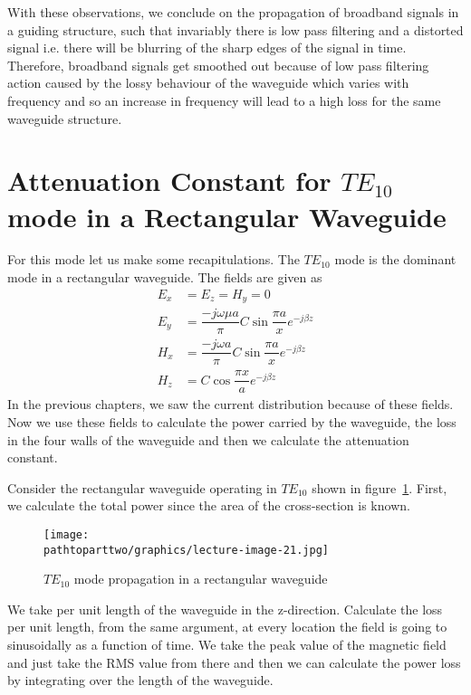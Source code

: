 With these observations, we conclude on the propagation of broadband signals in a guiding structure, such that invariably there is low pass filtering and a distorted signal i.e. there will be blurring of the sharp edges of the signal in time. Therefore, broadband signals get smoothed out because of low pass filtering action caused by the lossy behaviour of the waveguide which varies with frequency and so an increase in frequency will lead to a high loss for the same waveguide structure.

\section{Attenuation Constant for $TE_{10}$ mode in a Rectangular Waveguide}
For this mode let us make some recapitulations. The $TE_{10}$ mode is the dominant mode in a rectangular waveguide. The fields are given as
\begin{align}
E_{x} &= E_{z} = H_{y} = 0\\
E_{y} &= \dfrac{-j\omega\mu a }{\pi}C\sin \dfrac{\pi a}{x} e ^{-j\beta z}\label{eqn:eyrecte10}\\
H_{x} &= \dfrac{-j\omega a}{\pi} C \sin\dfrac{\pi a}{x}
e^{-j\beta z}\label{eqn:hxrecte10}\\
H_{z} &= C\cos \dfrac{\pi x}{a} e^{-j\beta z}\label{eqn:hzrecte10}
\end{align}
In the previous chapters, we saw the current distribution because of these fields. Now we use these fields to calculate the power carried by the waveguide, the loss in the four walls of the waveguide and then we calculate the attenuation constant.

Consider the rectangular waveguide operating in $TE_{10}$ shown in figure~\ref{fig:lectureimage21}. First, we calculate the total power since the area of the cross-section is known.
\begin{figure}[H]
\centering
\texttt{[image: \\pathtoparttwo/graphics/lecture-image-21.jpg]}
\caption{$TE_{10}$ mode propagation in a rectangular waveguide}
\label{fig:lectureimage21}
\end{figure}

We take per unit length of the waveguide in the z-direction. Calculate the loss per unit length, from the same argument, at every location the field is going to sinusoidally as a function of time. We take the peak value of the magnetic field and just take the RMS value from there and then we can calculate the power loss by integrating over the length of the waveguide.

